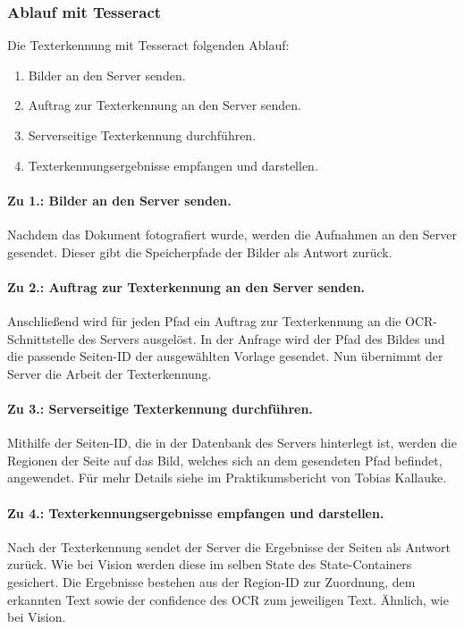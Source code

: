 \documentclass[notables, nomenclature, oneside, 150]{HSMW-Thesis}
\begin{document}
			\subsubsection*{Ablauf mit Tesseract}
				Die Texterkennung mit Tesseract folgenden Ablauf:
				\vspace{-5mm}
				\begin{enumerate}
					\item Bilder an den Server senden.
					\item Auftrag zur Texterkennung an den Server senden.
					\item Serverseitige Texterkennung durchführen.
					\item Texterkennungsergebnisse empfangen und darstellen.
				\end{enumerate}
				
				\paragraph*{Zu 1.: Bilder an den Server senden.}
				Nachdem das Dokument fotografiert wurde, werden die Aufnahmen an den Server gesendet. Dieser gibt die Speicherpfade der Bilder als Antwort zurück. 
				
				\paragraph*{Zu 2.: Auftrag zur Texterkennung an den Server senden.}
				Anschließend wird für jeden Pfad ein Auftrag zur Texterkennung an  die OCR-Schnittstelle des Servers ausgelöst. In der Anfrage wird der Pfad des Bildes und die passende Seiten-ID der ausgewählten Vorlage gesendet. Nun übernimmt der Server die Arbeit der Texterkennung.
				
				\paragraph*{Zu 3.: Serverseitige Texterkennung durchführen.}
				Mithilfe der Seiten-ID, die in der Datenbank des Servers hinterlegt ist, werden die Regionen der Seite auf das Bild, welches sich an dem gesendeten Pfad befindet, angewendet. Für mehr Details siehe im Praktikumsbericht von Tobias Kallauke. 
				
				\paragraph*{Zu 4.: Texterkennungsergebnisse empfangen und darstellen.}
				Nach der Texterkennung sendet der Server die Ergebnisse der Seiten als Antwort zurück. Wie bei Vision werden diese im selben State des State-Containers gesichert. Die Ergebnisse bestehen aus der Region-ID zur Zuordnung, dem erkannten Text sowie der confidence des OCR zum jeweiligen Text. Ähnlich, wie bei Vision.      
\end{document}
